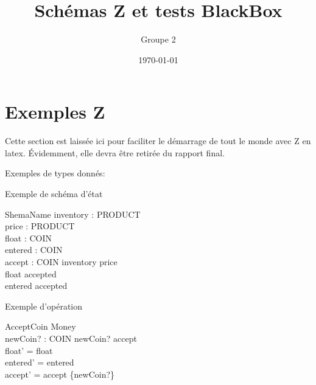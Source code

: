 \documentclass[12pt]{article}
\begin{document}
\title{Schémas Z et tests BlackBox}
\author{Groupe 2}
\date{\today}
\maketitle





\section{Exemples Z}
Cette section est laissée ici pour faciliter le démarrage de tout le monde avec Z en latex.  Évidemment, elle devra être retirée du rapport final.

Exemples de types donnés:
\begin{zed}
\end{zed}


Exemple de schéma d'état
\begin{schema}{ShemaName}
  inventory : \bag PRODUCT\\
  price : PRODUCT \pfun \nat\\
  float : \bag COIN\\
  entered : \bag COIN\\
  accept : \power COIN
  \where
  \dom inventory \subseteq \dom price\\
  \dom float \subseteq accepted\\
  \dom entered \subseteq accepted
\end{schema}

Exemple d'opération
\begin{schema}{AcceptCoin}
\Delta Money\\
newCoin? : COIN
\where
newCoin? \notin accept\\
float' = float\\
entered' = entered\\
accept' = accept \cup \{newCoin?\}
\end{schema}
\end{document}
